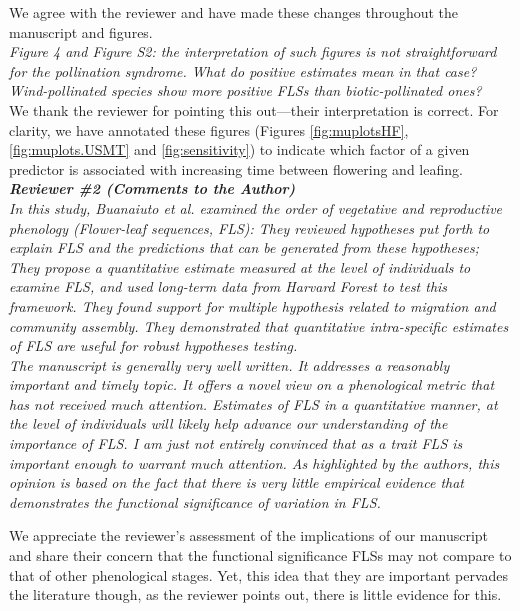 \documentclass{article}[11pt]
\begin{document}
\noindent We agree with the reviewer and have made these changes throughout the manuscript and figures.\\

\emph{Figure 4 and Figure S2: the interpretation of such figures is not straightforward for the pollination syndrome. What do positive estimates mean in that case? Wind-pollinated species show more positive FLSs than biotic-pollinated ones?}\\

\noindent We thank the reviewer for pointing this out---their interpretation is correct. For clarity, we have annotated these figures (Figures \ref{fig:muplotsHF}, \ref{fig:muplots.USMT} and \ref{fig:sensitivity}) to indicate which factor of a given predictor is associated with increasing time between flowering and leafing.\\

\emph{{\bf Reviewer \#2 (Comments to the Author)}}\\

\emph{In this study, Buanaiuto et al. examined the order of vegetative and reproductive phenology (Flower-leaf sequences, FLS): They reviewed hypotheses put forth to explain FLS and the predictions that can be generated from these hypotheses; They propose a  quantitative estimate measured at the level of individuals to examine FLS, and used long-term data from Harvard Forest to test this framework. They found support for multiple hypothesis related to migration and community assembly. They demonstrated that quantitative intra-specific estimates of FLS are useful for robust hypotheses testing.}\\

\emph{The manuscript is generally very well written. It addresses a reasonably important and timely topic. It offers a novel view on a phenological metric that has not received much attention. Estimates of FLS in a quantitative manner, at the level of individuals will likely help advance our understanding of the importance of FLS. I am just not entirely convinced that as a trait FLS is important enough to warrant much attention. As highlighted by the authors, this opinion is based on the fact that there is very little empirical evidence that demonstrates the functional significance of variation in FLS.}

\noindent We appreciate the reviewer's assessment of the implications of our manuscript and share their concern that the functional significance FLSs may not compare to that of other phenological stages. Yet, this idea that they are important pervades the literature \citep[e.g.][]{Rathcke_1985,Gougherty2018} though, as the reviewer points out, there is little evidence for this.\\
\end{document}
